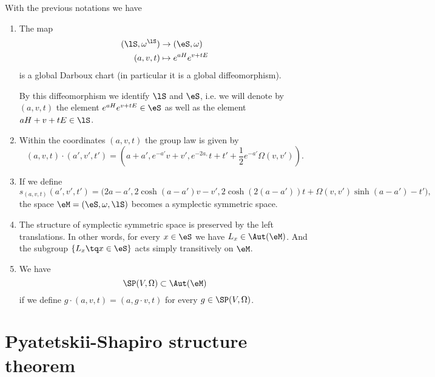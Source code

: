 \begin{proposition}		\label{Prop2807DescSMdarboux}
	With the previous notations we have
	\begin{enumerate}

		\item
			The map
			\begin{equation}
				\begin{aligned}
					(\lS,\omega^{\lS})&\to (\eS,\omega) \\
					(a,v,t)&\mapsto  e^{aH} e^{v+tE}
				\end{aligned}
			\end{equation}
			is a global Darboux chart (in particular it is a global diffeomorphism).

			By this diffeomorphism we identify $\lS$ and $\eS$, i.e. we will denote by $(a,v,t)$ the element $ e^{aH}e^{v+tE}\in\eS$ as well as the element $aH+v+tE\in\lS$.
		\item
			Within the coordinates $(a,v,t)$ the group law is given by
			\begin{equation}
				(a,v,t)\cdot (a',v',t')=
				(a+a', e^{-a'}v+v', e^{-2a,}t+t'+\frac{ 1 }{2} e^{-a'}\Omega(v,v')).
			\end{equation}
		\item
			If we define
			\begin{equation}		\label{Eq1807StuctSymM}
				s_{(a,v,t)}(a',v',t')=
				\big(2a-a',2\cosh(a-a')v-v',2\cosh(2(a-a'))t+\Omega(v,v')\sinh(a-a')-t'\big),
			\end{equation}
			the space $\eM=(\eS,\omega,\lS)$ becomes a symplectic symmetric space.

		\item
			The structure of symplectic symmetric space  is preserved by the left translations. In other words, for every $x\in\eS$ we have $L_x\in\Aut(\eM)$. And the subgroup $\{ L_x\tq x\in\eS \}$ acts simply transitively on $\eM$.

		\item
			We have
			\begin{equation}
				\SP(V,\Omega)\subset\Aut(\eM)
			\end{equation}
			if we define $g\cdot(a,v,t)=(a,g\cdot v,t)$ for every $g\in\SP(V,\Omega)$.
	\end{enumerate}
\end{proposition}


\section{Pyatetskii-Shapiro structure theorem}
\label{SecPyateskiiShapiro}

